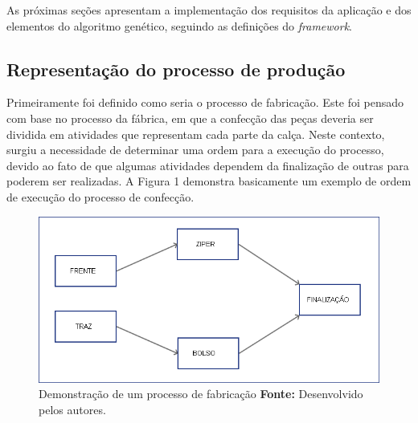\begin{itemize}
	
	
	
\end{itemize}

\par As próximas seções apresentam a implementação dos requisitos da aplicação
e dos elementos do algoritmo genético, seguindo as definições do \textit{framework}.

\subsection{Representação do processo de produção}

\par Primeiramente foi definido como seria o processo de fabricação. Este foi pensado com base no 
processo da fábrica, em que a confecção das peças deveria ser dividida em atividades que representam
cada parte da calça. Neste contexto, surgiu a necessidade de determinar uma ordem para a execução do processo, 
devido ao fato de que algumas atividades dependem da finalização de outras para poderem ser
realizadas. A Figura 1 demonstra basicamente um exemplo de ordem de execução do processo de confecção.

\newpage

\begin{figure}[h!]
	\centerline{\includegraphics[scale=0.6]{./imagens/processo1.png}}
	\caption[Processo de fabricação]
	{Demonstração de um processo de fabricação \textbf{Fonte:} Desenvolvido pelos
	autores.}
	\label{fig:exemplo1}
\end{figure}

